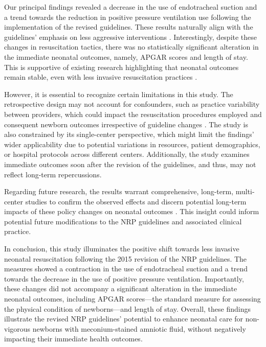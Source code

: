 \documentclass[11pt]{article}
\begin{document}
Our principal findings revealed a decrease in the use of endotracheal suction and a trend towards the reduction in positive pressure ventilation use following the implementation of the revised guidelines. These results naturally align with the guidelines' emphasis on less aggressive interventions \cite{Myers2020ImpactOT, Chiruvolu2018DeliveryRM}. Interestingly, despite these changes in resuscitation tactics, there was no statistically significant alteration in the immediate neonatal outcomes, namely, APGAR scores and length of stay. This is supportive of existing research highlighting that neonatal outcomes remain stable, even with less invasive resuscitation practices \cite{Myers2020ImpactOT, Chiruvolu2018DeliveryRM, Kamath-Rayne2018HelpingBB, Study2018EpidemiologyCS}. 

However, it is essential to recognize certain limitations in this study. The retrospective design may not account for confounders, such as practice variability between providers, which could impact the resuscitation procedures employed and consequent newborn outcomes irrespective of guideline changes \cite{Howard2020PerinatalMH}. The study is also constrained by its single-center perspective, which might limit the findings' wider applicability due to potential variations in resources, patient demographics, or hospital protocols across different centers. Additionally, the study examines immediate outcomes soon after the revision of the guidelines, and thus, may not reflect long-term repercussions.

Regarding future research, the results warrant comprehensive, long-term, multi-center studies to confirm the observed effects and discern potential long-term impacts of these policy changes on neonatal outcomes \cite{Amoakoh-Coleman2016EffectivenessOM, Sondaal2016AssessingTE}. This insight could inform potential future modifications to the NRP guidelines and associated clinical practice.

In conclusion, this study illuminates the positive shift towards less invasive neonatal resuscitation following the 2015 revision of the NRP guidelines. The measures showed a contraction in the use of endotracheal suction and a trend towards the decrease in the use of positive pressure ventilation. Importantly, these changes did not accompany a significant alteration in the immediate neonatal outcomes, including APGAR scores—the standard measure for assessing the physical condition of newborns—and length of stay. Overall, these findings illustrate the revised NRP guidelines' potential to enhance neonatal care for non-vigorous newborns with meconium-stained amniotic fluid, without negatively impacting their immediate health outcomes.
\end{document}
